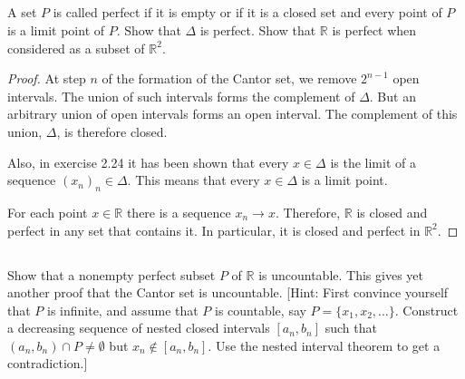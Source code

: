 
\subsection{} A set  $P$  is called perfect if it is empty or if it is a closed set and every point of $P$ is a limit point of $P$. Show that $\Delta$ is perfect. Show that $\mathbb{R}$ is perfect when considered as a subset of $\mathbb{R}^2$.

\begin{proof}
At step $n$ of the formation of the Cantor set, we remove $2^{n-1}$ open intervals. The union of such intervals forms the complement of $\Delta$. But an arbitrary union of open intervals forms an open interval. The complement of this union, $\Delta$, is therefore closed.

Also, in exercise 2.24 it has been shown that every $x\in \Delta$ is the limit of a sequence $(x_n)_n \in \Delta$. This means that every $x \in \Delta$ is a limit point.

\vspace{1em}

For each point $x \in \mathbb{R}$ there is a sequence $x_n \rightarrow x$. Therefore, $\mathbb{R}$ is closed and perfect in any set that contains it. In particular, it is closed and perfect in $\mathbb{R}^2$.

\end{proof}

\subsection{} Show that a  nonempty  perfect subset $P$  of $\mathbb{R}$ is uncountable.  This gives yet another proof that the Cantor set is uncountable.  [Hint: First convince yourself that $P$ is infinite, and assume that $P$ is countable, say $P = \{x_1, x_2, \dots \}$.  Construct a decreasing sequence of nested closed intervals $[a_n, b_n]$ such  that $(a_n, b_n) \cap P  \neq \emptyset$ but $x_n \notin [a_n, b_n]$. Use the nested interval theorem to get a contradiction.]

